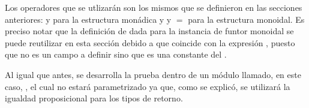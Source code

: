 
Los operadores que se utlizarán son los mismos que se definieron en las secciones anteriores:  y  para la estructura monádica y  y  $=$  para la estructura monoidal. Es preciso notar que la definición de  dada para la instancia de funtor monoidal se puede reutilizar en esta sección debido a que coincide con la expresión  , puesto que  no es un campo a definir sino que es una constante del  .

Al igual que antes, se desarrolla la prueba dentro de un módulo llamado, en este caso, , el cual no estará parametrizado ya que, como se explicó, se utilizará la igualdad proposicional para los tipos de retorno. 

